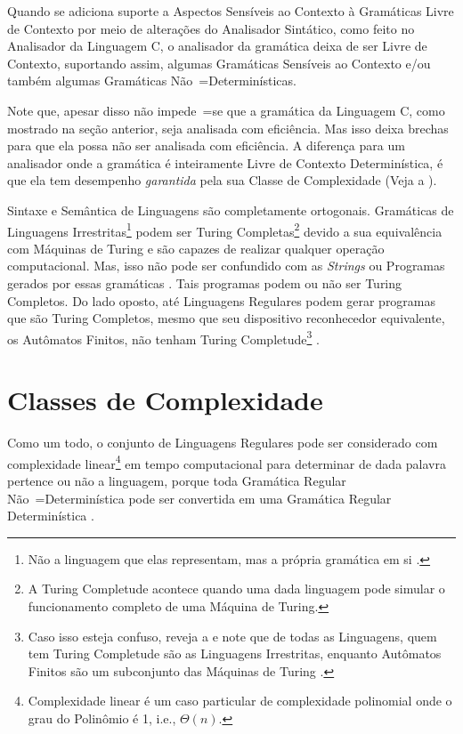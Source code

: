 Quando se adiciona suporte a Aspectos Sensíveis ao Contexto \cite{contextSensitiveParsing} à Gramáticas Livre de Contexto por meio de alterações do Analisador Sintático,
como feito no Analisador da Linguagem C,
o analisador da gramática deixa de ser Livre de Contexto,
suportando assim,
algumas Gramáticas Sensíveis ao Contexto e\slash{}ou também algumas Gramáticas Não~=Determinísticas.

Note que,
apesar disso não impede~=se que a gramática da Linguagem C,
como mostrado na seção anterior,
seja analisada com eficiência.
Mas isso deixa brechas para que ela possa não ser analisada com eficiência.
A diferença para um analisador onde a gramática é inteiramente Livre de Contexto Determinística,
é que ela tem desempenho \textit{garantida} pela sua Classe de Complexidade (Veja a ).

Sintaxe e
Semântica de Linguagens são completamente ortogonais.
Gramáticas de Linguagens Irrestritas\footnote{
Não a linguagem que elas representam,
mas a própria gramática em si \cite{finiteAutomataTuringComplete}.
}
podem ser Turing Completas\footnote{
A Turing Completude acontece quando uma dada linguagem pode simular o funcionamento completo de uma Máquina de Turing.
}
devido a sua equivalência com Máquinas de Turing e
são capazes de realizar qualquer operação computacional.
Mas,
isso não pode ser confundido com as \textit{Strings} ou
Programas gerados por essas gramáticas \cite{areThereDomainSpecificLanguages,yamlSpecificModelChecking}.
Tais programas podem ou
não ser Turing Completos.
Do lado oposto,
até Linguagens Regulares podem gerar programas que são Turing Completos,
mesmo que seu dispositivo reconhecedor equivalente,
os Autômatos Finitos,
não tenham Turing Completude\footnote{
Caso isso esteja confuso,
reveja a  e
note que de todas as Linguagens,
quem tem Turing Completude são as Linguagens Irrestritas,
enquanto Autômatos Finitos são um subconjunto das Máquinas de Turing \cite{finiteAutomataTuringComplete}.
}
\cite{turingCompleteRegularLanguages,finiteAutomataTuringComplete}.


\section{Classes de Complexidade}
\label{section:classesDeComplexidade}

Como um todo,
o conjunto de Linguagens Regulares pode ser considerado com complexidade linear\footnote{
Complexidade linear é um caso particular de complexidade polinomial onde o grau do Polinômio é 1,
i.e.,
$\Theta(n)$.
}
em tempo computacional para determinar de dada palavra pertence ou
não a linguagem,
porque toda Gramática Regular Não~=Determinística pode ser convertida em uma Gramática Regular Determinística \cite{sipserBook}.

